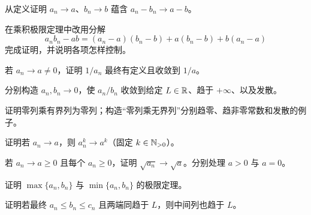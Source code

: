 \begin{enumerate}[label=\textbf{\thechapter.\arabic*.},ref=\thechapter.\arabic*,leftmargin=3.4em,labelsep=0.7em,itemsep=0.85em,topsep=0.8em,resume]
  从定义证明 \(a_n\to a\)、\(b_n\to b\) 蕴含 \(a_n-b_n\to a-b\)。

  在乘积极限定理中改用分解
 \[
 a_nb_n-ab=(a_n-a)(b_n-b)+a(b_n-b)+b(a_n-a)
 \]
完成证明，并说明各项怎样控制。

  若 \(a_n\to a\ne0\)，证明 \(1/a_n\) 最终有定义且收敛到 \(1/a\)。

  分别构造 \(a_n,b_n\to0\)，使 \(a_n/b_n\) 收敛到给定 \(L\in\mathbb{R}\)、趋于 \(+\infty\)、以及发散。

  证明零列乘有界列为零列；构造“零列乘无界列”分别趋零、趋非零常数和发散的例子。

  证明若 \(a_n\to a\)，则 \(a_n^k\to a^k\)（固定 \(k\in\mathbb{N}_{>0}\)）。

  若 \(a_n\to a\ge0\) 且每个 \(a_n\ge0\)，证明 \(\sqrt{a_n}\to\sqrt a\)。分别处理 \(a>0\) 与 \(a=0\)。

  证明 \(\max\{a_n,b_n\}\) 与 \(\min\{a_n,b_n\}\) 的极限定理。

  证明若最终 \(a_n\le b_n\le c_n\) 且两端同趋于 \(L\)，则中间列也趋于 \(L\)。
\end{enumerate}

